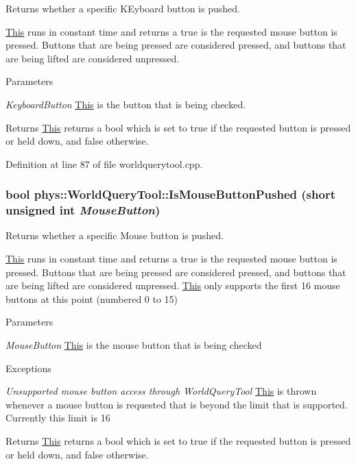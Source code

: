 Returns whether a specific KEyboard button is pushed. 

\hyperlink{structThis}{This} runs in constant time and returns a true is the requested mouse button is pressed. Buttons that are being pressed are considered pressed, and buttons that are being lifted are considered unpressed. 
\begin{DoxyParams}{Parameters}
\item[{\em KeyboardButton}]\hyperlink{structThis}{This} is the button that is being checked. \end{DoxyParams}
\begin{DoxyReturn}{Returns}
\hyperlink{structThis}{This} returns a bool which is set to true if the requested button is pressed or held down, and false otherwise. 
\end{DoxyReturn}


Definition at line 87 of file worldquerytool.cpp.

\hypertarget{classphys_1_1WorldQueryTool_af277b578432dfaefffbc4fd9bb80ca64}{
\subsubsection[{IsMouseButtonPushed}]{\setlength{\rightskip}{0pt plus 5cm}bool phys::WorldQueryTool::IsMouseButtonPushed (short unsigned int {\em MouseButton})}}
\label{d8/d69/classphys_1_1WorldQueryTool_af277b578432dfaefffbc4fd9bb80ca64}


Returns whether a specific Mouse button is pushed. 

\hyperlink{structThis}{This} runs in constant time and returns a true is the requested mouse button is pressed. Buttons that are being pressed are considered pressed, and buttons that are being lifted are considered unpressed. \hyperlink{structThis}{This} only supports the first 16 mouse buttons at this point (numbered 0 to 15) 
\begin{DoxyParams}{Parameters}
\item[{\em MouseButton}]\hyperlink{structThis}{This} is the mouse button that is being checked \end{DoxyParams}

\begin{DoxyExceptions}{Exceptions}
\item[{\em Unsupported mouse button access through WorldQueryTool}]\hyperlink{structThis}{This} is thrown whenever a mouse button is requested that is beyond the limit that is supported. Currently this limit is 16 \end{DoxyExceptions}
\begin{DoxyReturn}{Returns}
\hyperlink{structThis}{This} returns a bool which is set to true if the requested button is pressed or held down, and false otherwise. 
\end{DoxyReturn}


